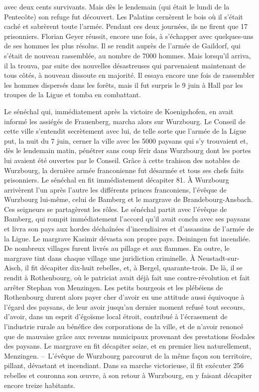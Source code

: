 \documentclass[french,twoside]{book} %
\begin{document}
avec deux cents survivants. Mais dès le lendemain (qui était le lundi de la Pentecôte) son refuge fut découvert. Les Palatins cernèrent le bois où il s’était caché et sabrèrent toute l’armée. Pendant ces deux journées, ils ne firent que 17 prisonniers. Florian Geyer réussit, encore une fois, à s’échapper avec quelques-uns de ses hommes les plus résolus. Il se rendit auprès de l’armée de Gaildorf, qui s’était de nouveau rassemblée, au nombre de 7000 hommes. Mais lorsqu’il arriva, il la trouva, par suite des nouvelles désastreuses qui parvenaient maintenant de tous côtés, à nouveau dissoute en majorité. Il essaya encore une fois de rassembler les hommes dispersés dans les forêts, mais il fut surpris le 9 juin à Hall par les troupes de la Ligue et tomba en combattant.\par
Le sénéchal qui, immédiatement après la victoire de Koenigshofen, en avait informé les assiégés de Frauenberg, marcha alors sur Wurzbourg. Le Conseil de cette ville s’entendit secrètement avec lui, de telle sorte que l’armée de la Ligue put, la nuit du 7 juin, cerner la ville avec les 5000 paysans qui s’y trouvaient et, dès le lendemain matin, pénétrer sans coup férir dans Wurzbourg dont les portes lui avaient été ouvertes par le Conseil. Grâce à cette trahison des notables de Wurzbourg, la dernière armée franconienne fut désarmée et tous ses chefs faits prisonniers. Le sénéchal en fit immédiatement décapiter 81. À Wurzbourg arrivèrent l’un après l’autre les différents princes franconiens, l’évêque de Wurzbourg lui-même, celui de Bamberg et le margrave de Brandebourg-Ansbach. Ces seigneurs se partagèrent les rôles. Le sénéchal partit avec l’évêque de Bamberg, qui rompit immédiatement l’accord qu’il avait conclu avec ses paysans et livra son pays aux hordes déchaînées d’incendiaires et d’assassins de l’armée de la Ligue. Le margrave Kasimir dévasta son propre pays. Deiningen fut incendiée. De nombreux villages furent livrés au pillage et aux flammes. En outre, le margrave tint dans chaque village une juridiction criminelle. À Neustadt-sur-Aisch, il fit décapiter dix-huit rebelles, et, à Bergel, quarante-trois. De là, il se rendit à Rothenbourg, où le patriciat avait déjà fait une contre-révolution et fait arrêter Stephan von Menzingen. Les petits bourgeois et les plébéiens de Rothenbourg durent alors payer cher d’avoir eu une attitude aussi équivoque à l’égard des paysans, de leur avoir jusqu’au dernier moment refusé tout secours, d’avoir, dans un esprit d’égoïsme local étroit, contribué à l’écrasement de l’industrie rurale au bénéfice des corporations de la ville, et de n’avoir renoncé que de mauvaise grâce aux revenus municipaux provenant des prestations féodales des paysans. Le margrave en fit décapiter seize, et en premier lieu naturellement, Menzingen. – L’évêque de Wurzbourg parcourut de la même façon son territoire, pillant, dévastant et incendiant. Dans sa marche victorieuse, il fit exécuter 256 rebelles et couronna son œuvre, à son retour à Wurzbourg, en y faisant décapiter encore treize habitants.\par
\end{document}
